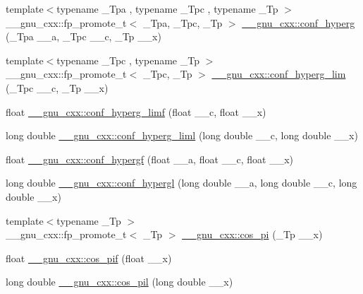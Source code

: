\begin{DoxyCompactItemize}
{\footnotesize template$<$typename \+\_\+\+Tpa , typename \+\_\+\+Tpc , typename \+\_\+\+Tp $>$ }\\\+\_\+\+\_\+gnu\+\_\+cxx\+::fp\+\_\+promote\+\_\+t$<$ \+\_\+\+Tpa, \+\_\+\+Tpc, \+\_\+\+Tp $>$ \hyperlink{group__gnu__math__spec__func_ga4d01e85e7d295afca5d9f8b6c68f19cc}{\+\_\+\+\_\+gnu\+\_\+cxx\+::conf\+\_\+hyperg} (\+\_\+\+Tpa \+\_\+\+\_\+a, \+\_\+\+Tpc \+\_\+\+\_\+c, \+\_\+\+Tp \+\_\+\+\_\+x)
\item 
{\footnotesize template$<$typename \+\_\+\+Tpc , typename \+\_\+\+Tp $>$ }\\\+\_\+\+\_\+gnu\+\_\+cxx\+::fp\+\_\+promote\+\_\+t$<$ \+\_\+\+Tpc, \+\_\+\+Tp $>$ \hyperlink{group__gnu__math__spec__func_ga9fe7a5e2e741f56d88fd29bc249feab2}{\+\_\+\+\_\+gnu\+\_\+cxx\+::conf\+\_\+hyperg\+\_\+lim} (\+\_\+\+Tpc \+\_\+\+\_\+c, \+\_\+\+Tp \+\_\+\+\_\+x)
\item 
float \hyperlink{group__gnu__math__spec__func_ga609879a370bc4e9fc70563806bc49cb9}{\+\_\+\+\_\+gnu\+\_\+cxx\+::conf\+\_\+hyperg\+\_\+limf} (float \+\_\+\+\_\+c, float \+\_\+\+\_\+x)
\item 
long double \hyperlink{group__gnu__math__spec__func_ga367be9b77eb1f9ccc2971d5300da48d1}{\+\_\+\+\_\+gnu\+\_\+cxx\+::conf\+\_\+hyperg\+\_\+liml} (long double \+\_\+\+\_\+c, long double \+\_\+\+\_\+x)
\item 
float \hyperlink{group__gnu__math__spec__func_gabd18e600aa78c3f2b2f835039506c810}{\+\_\+\+\_\+gnu\+\_\+cxx\+::conf\+\_\+hypergf} (float \+\_\+\+\_\+a, float \+\_\+\+\_\+c, float \+\_\+\+\_\+x)
\item 
long double \hyperlink{group__gnu__math__spec__func_ga0a9853f30d8fa515a12cd45a92da832e}{\+\_\+\+\_\+gnu\+\_\+cxx\+::conf\+\_\+hypergl} (long double \+\_\+\+\_\+a, long double \+\_\+\+\_\+c, long double \+\_\+\+\_\+x)
\item 
{\footnotesize template$<$typename \+\_\+\+Tp $>$ }\\\+\_\+\+\_\+gnu\+\_\+cxx\+::fp\+\_\+promote\+\_\+t$<$ \+\_\+\+Tp $>$ \hyperlink{group__gnu__math__spec__func_gafc4698ae591b0e9e61285b0794d43ef4}{\+\_\+\+\_\+gnu\+\_\+cxx\+::cos\+\_\+pi} (\+\_\+\+Tp \+\_\+\+\_\+x)
\item 
float \hyperlink{group__gnu__math__spec__func_gaddcae99c1572af6fa1d79b9cfa053033}{\+\_\+\+\_\+gnu\+\_\+cxx\+::cos\+\_\+pif} (float \+\_\+\+\_\+x)
\item 
long double \hyperlink{group__gnu__math__spec__func_ga9b6816c0abf30fd88417d79a33cb5465}{\+\_\+\+\_\+gnu\+\_\+cxx\+::cos\+\_\+pil} (long double \+\_\+\+\_\+x)
\item 

\end{DoxyCompactItemize}
